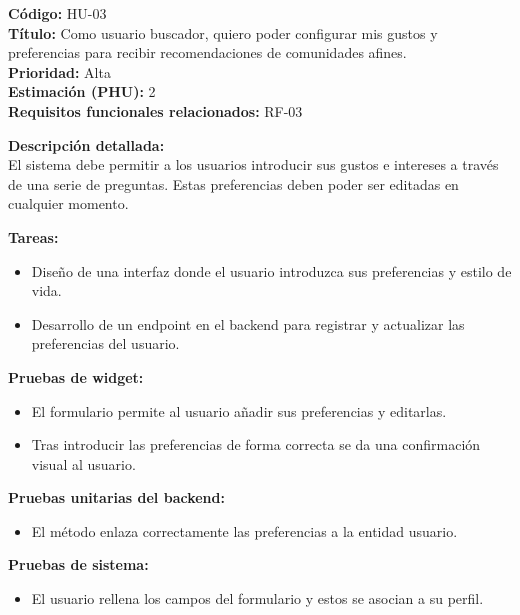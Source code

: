 \begin{tarjetaHU}
\textbf{Código:} HU-03 \\
\textbf{Título:} Como usuario buscador, quiero poder configurar mis gustos y preferencias para recibir recomendaciones de comunidades afines. \\
\textbf{Prioridad:} Alta \\
\textbf{Estimación (PHU):} 2 \\
\textbf{Requisitos funcionales relacionados:} RF-03

\vspace{0.5em}
\textbf{Descripción detallada:} \\
El sistema debe permitir a los usuarios introducir sus gustos e intereses a través de una serie de preguntas. Estas preferencias deben poder ser editadas en cualquier momento.

\vspace{0.5em}
\textbf{Tareas:}
\begin{itemize}[left=0pt]
  \item Diseño de una interfaz donde el usuario introduzca sus preferencias y estilo de vida.
  \item Desarrollo de un endpoint en el backend para registrar y actualizar las preferencias del usuario.
\end{itemize}

\vspace{0.5em}
\textbf{Pruebas de widget:}
\begin{itemize}[left=0pt]
  \item El formulario permite al usuario añadir sus preferencias y editarlas.
  \item Tras introducir las preferencias de forma correcta se da una confirmación visual al usuario.
\end{itemize}
\textbf{Pruebas unitarias del backend:}
\begin{itemize}[left=0pt]
  \item El método enlaza correctamente las preferencias a la entidad usuario. 
\end{itemize}
\textbf{Pruebas de sistema:}
\begin{itemize}[left=0pt]
  \item El usuario rellena los campos del formulario y estos se asocian a su perfil.
\end{itemize}

\end{tarjetaHU}

